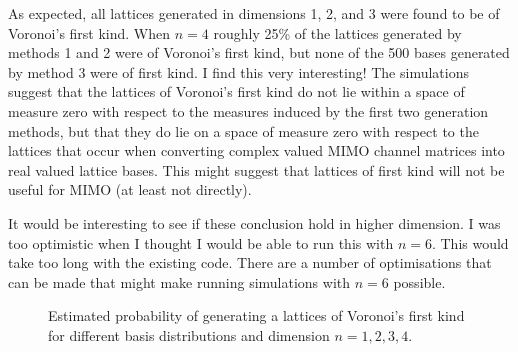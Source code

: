 \documentclass[a4paper,10pt]{article}
\begin{document}
As expected, all lattices generated in dimensions 1, 2, and 3 were found to be of Voronoi's first kind.  When $n=4$ roughly 25\% of the lattices generated by methods 1 and 2 were of Voronoi's first kind, but none of the 500 bases generated by method 3 were of first kind.  I find this very interesting! The simulations suggest that the lattices of Voronoi's first kind do not lie within a space of measure zero with respect to the measures induced by the first two generation methods, but that they do lie on a space of measure zero with respect to the lattices that occur when converting complex valued MIMO channel matrices into real valued lattice bases.  This might suggest that lattices of first kind will not be useful for MIMO (at least not directly).

It would be interesting to see if these conclusion hold in higher dimension. I was too optimistic when I thought I would be able to run this with $n=6$.  This would take too long with the existing code.  There are a number of optimisations that can be made that might make running simulations with $n=6$ possible.

\begin{figure}[tp]
\centering 
\caption{Estimated probability of generating a lattices of Voronoi's first kind for different basis distributions and dimension $n=1,2,3,4$.}
\end{figure}




 
%
\end{document}
